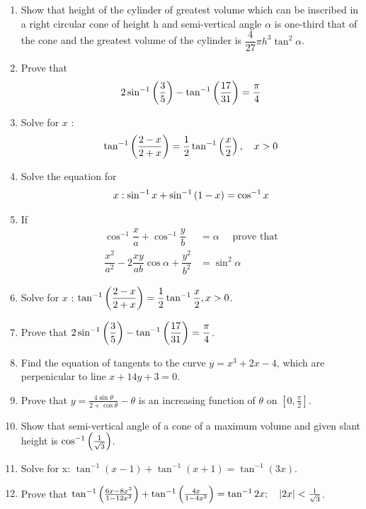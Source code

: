 \begin{enumerate}
    \item Show that height of the cylinder of greatest volume which can be inscribed in a right circular cone of height h and semi-vertical angle $\alpha$ is one-third that of the cone and the greatest volume of the cylinder is $\dfrac{4}{27} \pi h^3 \tan^2 \alpha$.
    \item Prove that
          \begin{align*}
              2\sin^{-1}\left(\dfrac{3}{5}\right)-\tan^{-1}\left(\dfrac{17}{31}\right)=\dfrac{\pi}{4}
          \end{align*}
    \item Solve for $x$ :
          \begin{align*}
              \tan^{-1}\left(\dfrac{2-x}{2+x}\right)=\dfrac{1}{2} \tan^{-1}\left(\dfrac{x}{2}\right),\quad x>0
          \end{align*}

    \item Solve the equation for
          \begin{align*}
              x: \sin^{-1} x + \sin^{-1}\left(1-x\right) = \cos^{-1}x
          \end{align*}
    \item If
          \begin{align*}
              \cos^{-1}\dfrac{x}{a} + \cos^{-1}\dfrac{y}{b}                   & = \alpha \quad \text{ prove that} \\
              \dfrac{x^2}{a^2} -2\dfrac{xy}{ab}\cos \alpha + \dfrac{y^2}{b^2} & = \sin^2 \alpha
          \end{align*}
    \item Solve for $x$ : $ \tan^{-1}\left(\dfrac{2-x}{2+x}\right) = \dfrac{1}{2}\tan^{-1}\dfrac{x}{2}, x>0$.
    \item Prove that $2\sin^{-1}\left(\dfrac{3}{5}\right) - \tan^{-1}\left(\dfrac{17}{31}\right) = \dfrac{\pi}{4}$.
    \item Find the equation of tangents to the curve $y=x^3+2x-4$, which are perpenicular to line $x+14y+3=0$.

\item Prove that $y = \frac{4\sin\theta}{2+\cos\theta} - \theta$ is an increasing function of $\theta$ on $\left [0, \frac{\pi}{2}\right ]$.

\item Show that semi-vertical angle of a cone of a maximum volume and given slant height is $\cos^{-1}\left(\frac{1}{\sqrt{3}}\right)$.

\item Solve for x: $\tan^{-1}(x-1) + \tan^{-1}(x+1) = \tan^{-1}(3x)$.

\item Prove that $\tan^{-1}\left(\frac{6x-8x^3}{1-12x^2}\right) + \tan^{-1}\left(\frac{4x}{1-4x^2}\right) = \tan^{-1}2x; \quad \left\vert2x\right\vert<\frac{1}{\sqrt{3}}$.

\end{enumerate}
